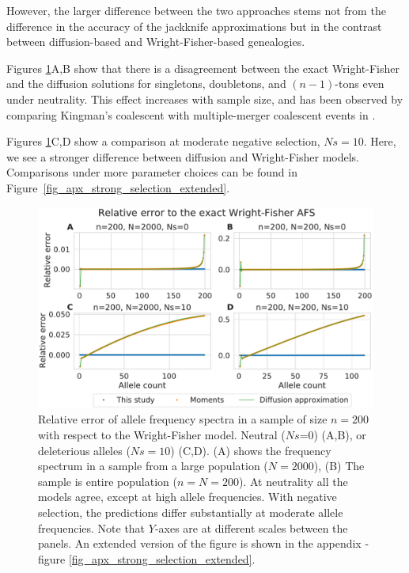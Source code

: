 \documentclass[9pt,twocolumn,twoside,lineno]{gsajnl}
\begin{document}
However, the larger difference between the two approaches stems not from the difference in the accuracy of the jackknife approximations but in the
contrast between diffusion-based and Wright-Fisher-based genealogies.

Figures \ref{fig_strong_selection}A,B show that there is a disagreement between the exact
Wright-Fisher and the diffusion solutions for singletons, doubletons, and $(n-1)$-tons even under neutrality. 
This effect increases with sample size, and has been observed by comparing
Kingman's coalescent with multiple-merger coalescent events in \citep{Fu2006, BhaskarEtAl2014}.



Figures \ref{fig_strong_selection}C,D show a comparison at moderate negative selection, $Ns=10$.
Here, we see a stronger difference between diffusion and Wright-Fisher models. 
Comparisons under more parameter choices can be found in  Figure~\ref{fig_apx_strong_selection_extended}.

\begin{figure}
  \centering
  \includegraphics[width=\columnwidth]{fig/afs_comp_small.pdf}

  \caption{Relative error of allele frequency spectra in a sample of size $n=200$ with respect to
    the Wright-Fisher model. Neutral ($Ns$=0) (A,B), or deleterious alleles ($Ns=10$) (C,D). (A) shows
    the frequency spectrum in a sample from a large population ($N=2000$), (B) The sample is entire
    population ($n=N=200$). At neutrality all the models agree, except at high allele frequencies.
    With negative selection, the predictions differ substantially at moderate allele frequencies.
    Note that $Y$-axes are at different scales between the panels. An extended version of the figure
    is shown in the appendix - figure \ref{fig_apx_strong_selection_extended}.}

  \label{fig_strong_selection}
\end{figure}
\end{document}

